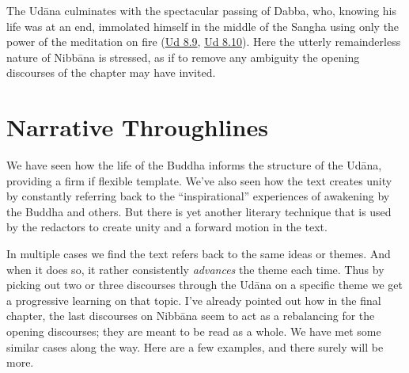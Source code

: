 \documentclass[12pt,openany]{book}%
\begin{document}
The \textsanskrit{Udāna} culminates with the spectacular passing of Dabba, who, knowing his life was at an end, immolated himself in the middle of the Sangha using only the power of the meditation on fire (\href{https://suttacentral.net/ud8.9/en/sujato}{Ud 8.9}, \href{https://suttacentral.net/ud8.10/en/sujato}{Ud 8.10}). Here the utterly remainderless nature of \textsanskrit{Nibbāna} is stressed, as if to remove any ambiguity the opening discourses of the chapter may have invited. 

\section*{Narrative Throughlines}

We have seen how the life of the Buddha informs the structure of the \textsanskrit{Udāna}, providing a firm if flexible template. We’ve also seen how the text creates unity by constantly referring back to the “inspirational” experiences of awakening by the Buddha and others. But there is yet another literary technique that is used by the redactors to create unity and a forward motion in the text. 

In multiple cases we find the text refers back to the same ideas or themes. And when it does so, it rather consistently \emph{advances} the theme each time. Thus by picking out two or three discourses through the \textsanskrit{Udāna} on a specific theme we get a progressive learning on that topic. I’ve already pointed out how in the final chapter, the last discourses on \textsanskrit{Nibbāna} seem to act as a rebalancing for the opening discourses; they are meant to be read as a whole. We have met some similar cases along the way. Here are a few examples, and there surely will be more.
\end{document}
